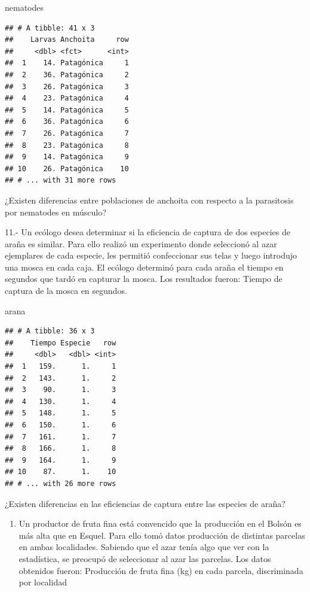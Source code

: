 \documentclass[]{book}
\newenvironment{Shaded}{\begin{snugshade}}{\end{snugshade}}
\newcommand{\NormalTok}[1]{#1}
\providecommand{\tightlist}{%
  \setlength{\itemsep}{0pt}\setlength{\parskip}{0pt}}
\theoremstyle{definition}
\theoremstyle{definition}
\theoremstyle{definition}
\theoremstyle{remark}
\begin{document}
\begin{Shaded}
\begin{Highlighting}[]
\NormalTok{nematodes}
\end{Highlighting}
\end{Shaded}

\begin{verbatim}
## # A tibble: 41 x 3
##    Larvas Anchoita     row
##     <dbl> <fct>      <int>
##  1    14. Patagónica     1
##  2    36. Patagónica     2
##  3    26. Patagónica     3
##  4    23. Patagónica     4
##  5    14. Patagónica     5
##  6    36. Patagónica     6
##  7    26. Patagónica     7
##  8    23. Patagónica     8
##  9    14. Patagónica     9
## 10    26. Patagónica    10
## # ... with 31 more rows
\end{verbatim}

¿Existen diferencias entre poblaciones de anchoita con respecto a la
parasitosis por nematodes en músculo?

11.- Un ecólogo desea determinar si la eficiencia de captura de dos
especies de araña es similar. Para ello realizó un experimento donde
seleccionó al azar ejemplares de cada especie, les permitió confeccionar
sus telas y luego introdujo una mosca en cada caja. El ecólogo determinó
para cada araña el tiempo en segundos que tardó en capturar la mosca.
Los resultados fueron: Tiempo de captura de la mosca en segundos.

\begin{Shaded}
\begin{Highlighting}[]
\NormalTok{arana}
\end{Highlighting}
\end{Shaded}

\begin{verbatim}
## # A tibble: 36 x 3
##    Tiempo Especie   row
##     <dbl>   <dbl> <int>
##  1   159.      1.     1
##  2   143.      1.     2
##  3    90.      1.     3
##  4   130.      1.     4
##  5   148.      1.     5
##  6   150.      1.     6
##  7   161.      1.     7
##  8   166.      1.     8
##  9   164.      1.     9
## 10    87.      1.    10
## # ... with 26 more rows
\end{verbatim}

¿Existen diferencias en las eficiencias de captura entre las especies de
araña?

\begin{enumerate}
\def\labelenumi{\arabic{enumi}.}
\setcounter{enumi}{11}
\tightlist
\item
  Un productor de fruta fina está convencido que la producción en el
  Bolsón es más alta que en Esquel. Para ello tomó datos producción de
  distintas parcelas en ambas localidades. Sabiendo que el azar tenía
  algo que ver con la estadística, se preocupó de seleccionar al azar
  las parcelas. Los datos obtenidos fueron: Producción de fruta fina
  (kg) en cada parcela, discriminada por localidad
\end{enumerate}
\end{document}
